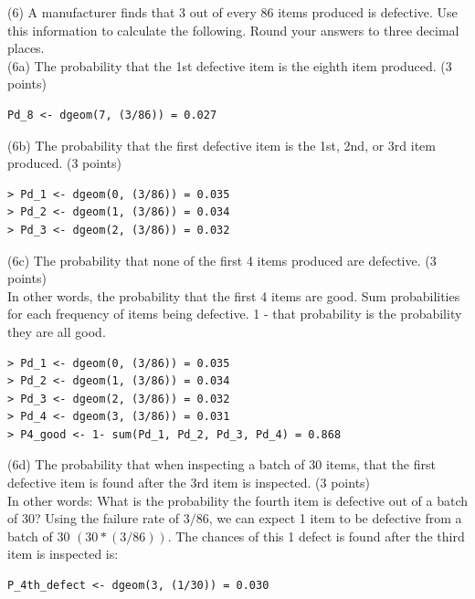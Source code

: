 \documentclass{article}
\begin{document}
(6) A manufacturer finds that 3 out of every 86 items produced is defective. Use this information to calculate the following. Round your answers to three decimal places.\\

(6a) The probability that the 1st defective item is the eighth item produced. (3 points)
\begin{center}
\begin{lstlisting}
Pd_8 <- dgeom(7, (3/86)) = 0.027
\end{lstlisting}
\end{center}

(6b) The probability that the first defective item is the 1st, 2nd, or 3rd item produced. (3 points)\\

\begin{center}
\begin{lstlisting}
> Pd_1 <- dgeom(0, (3/86)) = 0.035
> Pd_2 <- dgeom(1, (3/86)) = 0.034
> Pd_3 <- dgeom(2, (3/86)) = 0.032
\end{lstlisting}
\end{center}
(6c) The probability that none of the first 4 items produced are defective. (3 points)\\

In other words, the probability that the first 4 items are good. Sum probabilities for each frequency of items being defective. 1 - that probability is the probability they are all good.

\begin{center}
\begin{lstlisting}
> Pd_1 <- dgeom(0, (3/86)) = 0.035
> Pd_2 <- dgeom(1, (3/86)) = 0.034
> Pd_3 <- dgeom(2, (3/86)) = 0.032
> Pd_4 <- dgeom(3, (3/86)) = 0.031
> P4_good <- 1- sum(Pd_1, Pd_2, Pd_3, Pd_4) = 0.868

\end{lstlisting}
\end{center}


(6d) The probability that when inspecting a batch of 30 items, that the first defective item is found after the 3rd item is inspected. (3 points)\\

In other words: What is the probability the fourth item is defective out of a batch of 30? Using the failure rate of $3/86$, we can expect 1 item to be defective from a batch of 30 $(30 * (3/86))$. The chances of this 1 defect is found after the third item is inspected is:

\begin{center}
\begin{lstlisting}
P_4th_defect <- dgeom(3, (1/30)) = 0.030	
\end{lstlisting}
\end{center}
\end{document}
